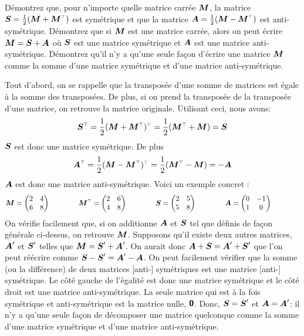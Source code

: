 \begin{exemple}
 Démontrez que, pour n'importe quelle matrice carrée $\boldsymbol{M}$, la matrice $\mat{S} = \frac{1}{2}(\matM + \transp{\matM})$ est symétrique et que la matrice $\matA=\frac{1}{2}(\matM - \transp{\matM})$ est anti-symétrique.
 Démontrez que si $\boldsymbol{M}$ est une matrice carrée, alors on peut écrire $\boldsymbol{M} = \boldsymbol{S} + \boldsymbol{A}$ où $\boldsymbol{S}$ est une matrice symétrique
et $\boldsymbol{A}$ est une matrice anti-symétrique.
 Démontrez qu'il n'y a qu'une seule façon d'écrire une matrice $\boldsymbol{M}$ comme la somme d'une matrice symétrique et 
d'une matrice anti-symétrique.

\solution
{}Tout d'abord, on se rappelle que la transposée d'une somme de matrices est égale 
à la somme des transposées. De plus, si on prend la transposée de la transposée d'une matrice, on retrouve
la matrice originale.  Utilisant ceci, nous avons:
\[
	\transp{\mat{S}} = \frac{1}{2}\transp{(\matM + \transp{\matM})} = \frac{1}{2}(\transp{\matM} + \matM) = \mat{S}
\]
	$\boldsymbol{S}$ est donc une matrice symétrique.  De plus
\[
\transp{\matA} = \frac{1}{2}\transp{(\matM - \transp{\matM})} = \frac{1}{2}(\transp{\matM} - \matM) = -\matA
\]
$\boldsymbol{A}$ est donc une matrice anti-symétrique.
Voici un exemple concret :
\[
\matM = \begin{pmatrix}
2 & 4 \\ 6 & 8
\end{pmatrix}
\qquad\qquad
\transp{\matM} = \begin{pmatrix}
2 & 6 \\ 4 & 8
\end{pmatrix}
\qquad\qquad
\mat{S} = \begin{pmatrix}
2 & 5 \\ 5 & 8
\end{pmatrix}
\qquad\qquad
\matA = \begin{pmatrix}
0 & -1 \\ 1 & 0
\end{pmatrix}
\qquad\qquad
\]
  On vérifie facilement que, si on additionne $\boldsymbol{A}$ et $\boldsymbol{S}$ tel que définis 
 de façon générale ci-dessus, on retrouve $\boldsymbol{M}$.
 Supposons qu'il existe deux autres matrices, $\boldsymbol{A}'$ et $\boldsymbol{S}'$ telles que $\boldsymbol{M} = \boldsymbol{S}' + \boldsymbol{A}'$.  On aurait donc
$\boldsymbol{A} + \boldsymbol{S} = \boldsymbol{A}' + \boldsymbol{S}'$ que l'on peut réécrire comme $\boldsymbol{S}-\boldsymbol{S}' = \boldsymbol{A}'-\boldsymbol{A}$. 
 On peut facilement vérifier que la somme (ou la différence) de deux matrices [anti-] symétriques est une matrice 
 [anti-] symétrique. 
Le côté gauche de l'égalité est donc une matrice symétrique et le côté droit est une matrice anti-symétrique. 
La seule matrice qui est à la fois symétrique et anti-symétrique est la matrice nulle, $\mbox{\textsf{\textbf{{0}}}}$. 
Donc, $\boldsymbol{S}=\boldsymbol{S}'$ et $\boldsymbol{A}=\boldsymbol{A}'$: il n'y a qu'une seule façon de décomposer une matrice quelconque 
comme la somme d'une matrice symétrique et d'une matrice anti-symétrique.
\end{exemple}


